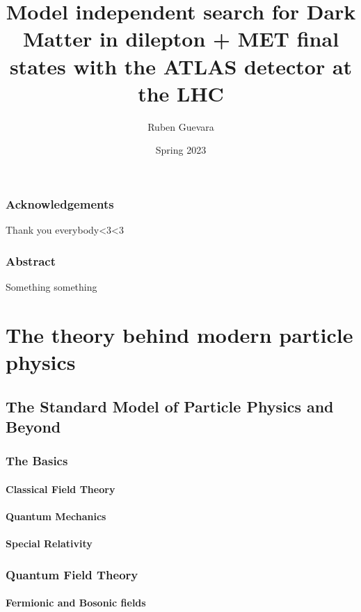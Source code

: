 \documentclass[14pt, a4paper]{book}
\title{Model independent search for Dark Matter
in dilepton + MET final states with the ATLAS detector at the LHC 
}
\author{Ruben Guevara}
\date{Spring 2023}
\begin{document}
\duoforside[
dept = {Department of Physics},
long,
program = {Physics: Nuclear and Particle Physics},
]
\newpage
\section*{Acknowledgements}
Thank you everybody<3<3

\newpage
\begin{center}
\section*{Abstract}
Something something
\end{center}


\newpage
\tableofcontents
\listoffigures
\listoftables

\newpage
{}
\part{The theory behind modern particle physics}


\chapter{The Standard Model of Particle Physics and Beyond}

\section{The Basics}
\subsection{Classical Field Theory}


\subsection{Quantum Mechanics}


\subsection{Special Relativity}


\section{Quantum Field Theory}


\subsection{Fermionic and Bosonic fields}
\end{document}
